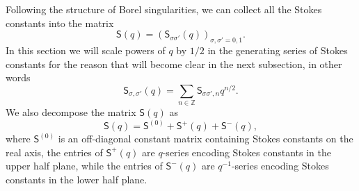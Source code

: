 \documentclass[a4paper,11pt]{article}
\theoremstyle{definition}
\def\IZ{{\mathbb Z}}
\newcommand{\re}{{\rm e}}
\newcommand{\ri}{{\rm i}}
\newcommand{\bb}{\mathsf{b}}
\def\ms{\mathsf}
\begin{document}
Following the structure of Borel singularities, we can collect all the
Stokes constants into the matrix
\begin{equation}
  \ms{S}(q) = (\ms{S}_{\sigma\sigma'}(q))_{\sigma,\sigma'=0,1}.
\end{equation}
In this section we will 
scale powers of $q$ by $1/2$ in the generating series of Stokes
constants for the reason that will become clear in the next
subsection, in other words
\begin{equation}
  \ms{S}_{\sigma,\sigma'}(q) = \sum_{n\in\IZ} \ms{S}_{\sigma\sigma',n}q^{n/2}.
\end{equation}
We also decompose the matrix $\ms{S}(q)$ as
\begin{equation}
  \ms{S}(q) = \ms{S}^{(0)}+\ms{S}^+(q) + \ms{S}^-(q),
\end{equation}
%
where $\ms{S}^{(0)}$ is an off-diagonal constant matrix containing
Stokes constants on the real axis, the entries of $\ms{S}^+(q)$
are $q$-series encoding Stokes constants in the upper half plane,
while the entries of $\ms{S}^-(q)$ are $q^{-1}$-series encoding
Stokes constants in the lower half plane.
\end{document}
